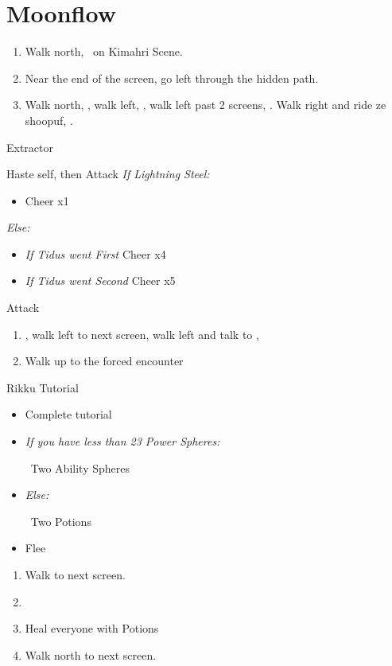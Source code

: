 \chapter{Moonflow}

\begin{enumerate}
  \item Walk north, \sd\ on Kimahri Scene.
  \item Near the end of the screen, go left through the hidden path. 
  \item Walk north, \sd, walk left, \sd, walk left past 2 screens, \sd. Walk right and ride ze shoopuf, \sd.
\end{enumerate}
\begin{battle}[4000]{Extractor}
  \begin{itemize}
    \tidusf Haste self, then \wakka
    \wakkaf Attack
    \tidusf \textit{If Lightning Steel:}
    \begin{itemize}
      \item Cheer x1
    \end{itemize}
    \textit{Else:}
    \begin{itemize}
      \item \textit{If Tidus went First} Cheer x4
      \item \textit{If Tidus went Second} Cheer x5
    \end{itemize}
    \tidusf Attack
  \end{itemize}
\end{battle}
\begin{enumerate}[resume]
  \item \sd, walk left to next screen, walk left and talk to \rikku, \sd
  \item Walk up to the forced encounter
\end{enumerate}
\begin{battle}{Rikku Tutorial}
  \begin{itemize}
    \item Complete tutorial
    \item \textit{If you have less than 23 Power Spheres:}
          \begin{itemize}
            \rikkuf \od\ Two Ability Spheres
          \end{itemize}
    \item \textit{Else:}
          \begin{itemize}
            \rikkuf \od\ Two Potions
          \end{itemize}
    \item Flee
  \end{itemize}
\end{battle}
\begin{enumerate}[resume]
  \item Walk to next screen.
  \item \formation{\tidus}{\yuna}{\auron}
  \item Heal everyone with Potions
  \item Walk north to next screen.
\end{enumerate}